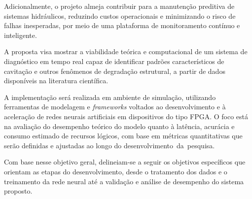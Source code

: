 Adicionalmente, o projeto almeja contribuir para a manutenção preditiva de sistemas hidráulicos, reduzindo custos operacionais e minimizando o risco de falhas inesperadas, por meio de uma plataforma de monitoramento contínuo e inteligente.

A proposta visa mostrar a viabilidade teórica e computacional de um sistema de diagnóstico em tempo real capaz de identificar padrões característicos de cavitação e outros fenômenos de degradação estrutural, a partir de dados disponíveis na literatura científica.

A implementação será realizada em ambiente de simulação, utilizando ferramentas de modelagem e \textit{frameworks} voltados ao desenvolvimento e à aceleração de redes neurais artificiais em dispositivos do tipo FPGA. O foco está na avaliação do desempenho teórico do modelo quanto à latência, acurácia e consumo estimado de recursos lógicos, com base em métricas quantitativas que serão definidas e ajustadas ao longo do \mbox{desenvolvimento da pesquisa.}


Com base nesse objetivo geral, delineiam-se a seguir os objetivos específicos que orientam as etapas do desenvolvimento, desde o tratamento dos dados e o treinamento da rede neural até a validação e análise de desempenho do sistema proposto.

